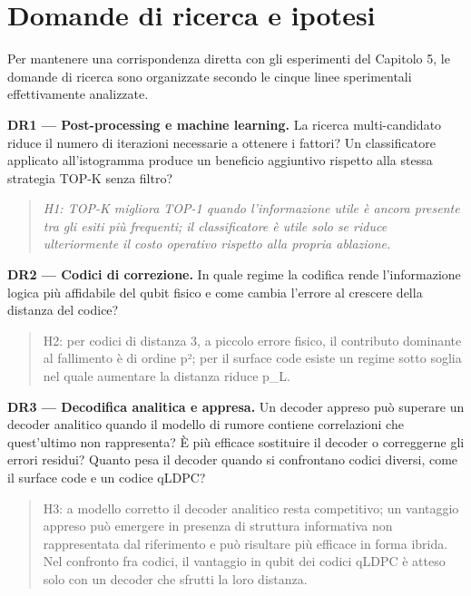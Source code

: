 \section{Domande di ricerca e ipotesi}\label{sec:finale_2_4}

Per mantenere una corrispondenza diretta con gli esperimenti del Capitolo 5, le domande di ricerca sono organizzate secondo le cinque linee sperimentali effettivamente analizzate.

\textbf{DR1 --- Post-processing e machine learning.} La ricerca multi-candidato riduce il numero di iterazioni necessarie a ottenere i fattori? Un classificatore applicato all'istogramma produce un beneficio aggiuntivo rispetto alla stessa strategia TOP-K senza filtro?

\begin{quote}
\emph{H1: TOP-K migliora TOP-1 quando l'informazione utile è ancora presente tra gli esiti più frequenti; il classificatore è utile solo se riduce ulteriormente il costo operativo rispetto alla propria ablazione.}
\end{quote}

\textbf{DR2 --- Codici di correzione.} In quale regime la codifica rende l'informazione logica più affidabile del qubit fisico e come cambia l'errore al crescere della distanza del codice?

\begin{quote}
H2: per codici di distanza 3, a piccolo errore fisico, il contributo dominante al fallimento è di ordine p²; per il surface code esiste un regime sotto soglia nel quale aumentare la distanza riduce p\_L. \cite{steane1996,fowler2012,googleQECBelowThreshold2025,googleSurfaceCode2023,dennis2002topological}
\end{quote}

\textbf{DR3 --- Decodifica analitica e appresa.} Un decoder appreso può superare un decoder analitico quando il modello di rumore contiene correlazioni che quest'ultimo non rappresenta? È più efficace sostituire il decoder o correggerne gli errori residui? Quanto pesa il decoder quando si confrontano codici diversi, come il surface code e un codice qLDPC?

\begin{quote}
H3: a modello corretto il decoder analitico resta competitivo; un vantaggio appreso può emergere in presenza di struttura informativa non rappresentata dal riferimento e può risultare più efficace in forma ibrida. Nel confronto fra codici, il vantaggio in qubit dei codici qLDPC è atteso solo con un decoder che sfrutti la loro distanza. \cite{alphaqubit2024,torlaiMelko2017,yan2026,bravyi2024}
\end{quote}

